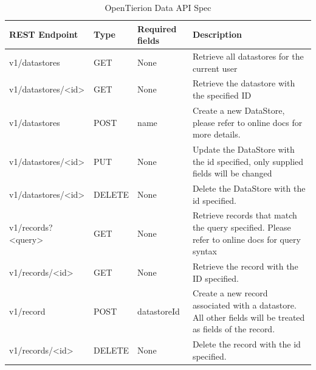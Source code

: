 \documentclass[12pt,msc,a4paper,oneside]{ucl_thesis}
\begin{document}
\begin{table}
    \begin{tabularx}{\textwidth}{| l l X X |}
        \hline
        \textbf{REST Endpoint} & \textbf{Type} & \textbf{Required fields} & \textbf{Description} \\
        \hline
		v1/datastores & GET & None & Retrieve all datastores for the current user \\

        v1/datastores/\textless id\textgreater & GET & None & Retrieve the datastore with the specified ID \\

        v1/datastores & POST & name & Create a new DataStore, please refer to online docs for more details. \\

        v1/datastores/\textless id\textgreater & PUT & None & Update the DataStore with the id specified, only supplied fields will be changed \\

        v1/datastores/\textless id\textgreater & DELETE & None & Delete the DataStore with the id specified. \\

        v1/records?\textless query\textgreater & GET & None & Retrieve records that match the query specified. Please refer to online docs for query syntax \\

        v1/records/\textless id\textgreater & GET & None & Retrieve the record with the ID specified. \\

        v1/record & POST & datastoreId & Create a new record associated with a datastore. All other fields will be treated as fields of the record. \\

        v1/records/\textless id\textgreater & DELETE & None & Delete the record with the id specified. \\

        \hline
    \end{tabularx}
    \caption{OpenTierion Data API Spec}
    \label{tab:opentierion_data_api}
\end{table}
\end{document}
